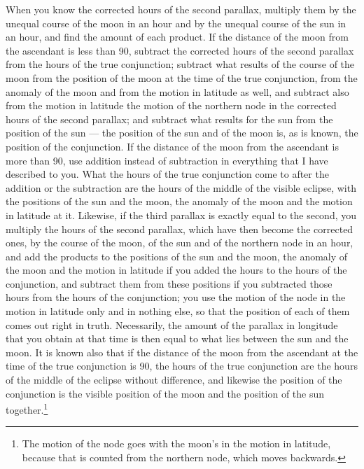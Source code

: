 \documentclass[11pt]{article}
\newcommand{\ArPage}[1]{\marginpar{\footnotesize\color{gray}Ar.\,p.\,#1}}
\begin{document}
\par \ArPage{160}When you know the corrected hours of the second parallax, multiply them by the unequal course of the moon in an hour and by the unequal course of the sun in an hour, and find the amount of each product. If the distance of the moon from the ascendant is less than 90, subtract the corrected hours of the second parallax from the hours of the true conjunction; subtract what results of the course of the moon from the position of the moon at the time of the true conjunction, from the anomaly of the moon and from the motion in latitude as well, and subtract also from the motion in latitude the motion of the northern node in the corrected hours of the second parallax; and subtract what results for the sun from the position of the sun — the position of the sun and of the moon is, as is known, the position of the conjunction. If the distance of the moon from the ascendant is more than 90, use addition instead of subtraction in everything that I have described to you. What the hours of the true conjunction come to after the addition or the subtraction are the hours of the middle of the visible eclipse, with the positions of the sun and the moon, the anomaly of the moon and the motion in latitude at it. Likewise, if the third parallax is exactly equal to the second, you multiply the hours of the second parallax, which have then become the corrected ones, by the course of the moon, of the sun and of the northern node in an hour, and add the products to the positions of the sun and the moon, the anomaly of the moon and the motion in latitude if you added the hours to the hours of the conjunction, and subtract them from these positions if you subtracted those hours from the hours of the conjunction; you use the motion of the node in the motion in latitude only and in nothing else, so that the position of each of them comes out right in truth. Necessarily, the amount of the parallax in longitude that you obtain at that time is then equal to what lies between the sun and the moon. It is known also that if the distance of the moon from the ascendant at the time of the true conjunction is 90, the hours of the true conjunction are the hours of the middle of the eclipse without difference, and likewise the position of the conjunction is the visible position of the moon and the position of the sun together.\footnote{The motion of the node goes with the moon's in the motion in latitude, because that is counted from the northern node, which moves backwards.}\par
\end{document}
